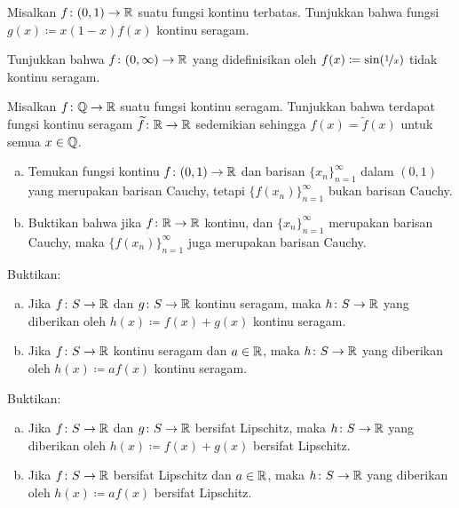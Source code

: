 \begin{exercise}
Misalkan $f \colon (0,1) \to {\mathbb{R}}$ suatu fungsi kontinu terbatas.  Tunjukkan bahwa
fungsi
$g(x) \coloneqq x(1-x)f(x)$ kontinu seragam.
\end{exercise}

\begin{exercise}
Tunjukkan bahwa $f \colon (0,\infty) \to {\mathbb{R}}$ yang didefinisikan oleh $f(x) \coloneqq \sin
(\nicefrac{1}{x})$ tidak kontinu seragam.
\end{exercise}

\begin{exercise}[Menantang]
Misalkan $f \colon {\mathbb{Q}} \to {\mathbb{R}}$ suatu fungsi kontinu seragam.  Tunjukkan bahwa
terdapat fungsi kontinu seragam $\widetilde{f} \colon {\mathbb{R}} \to {\mathbb{R}}$
sedemikian sehingga $f(x) = \widetilde{f}(x)$ untuk semua $x \in {\mathbb{Q}}$.
\end{exercise}

\begin{samepage}
\begin{exercise}
\leavevmode
\begin{enumerate}[a)]
\item
Temukan fungsi kontinu $f \colon (0,1) \to {\mathbb{R}}$ dan barisan
$\{ x_n \}_{n=1}^\infty$ dalam
$(0,1)$ yang merupakan barisan Cauchy, tetapi $\bigl\{ f(x_n) \bigr\}_{n=1}^\infty$ bukan barisan Cauchy.
\item
Buktikan bahwa jika $f \colon {\mathbb{R}} \to {\mathbb{R}}$ kontinu,
dan $\{ x_n \}_{n=1}^\infty$ merupakan
barisan Cauchy, maka $\bigl\{ f(x_n) \bigr\}_{n=1}^\infty$ juga merupakan barisan Cauchy.
\end{enumerate}
\end{exercise}
\end{samepage}

\begin{samepage}
\begin{exercise}
Buktikan:
\begin{enumerate}[a)]
\item
Jika $f \colon S \to {\mathbb{R}}$ dan $g \colon S \to {\mathbb{R}}$ kontinu seragam,
maka $h \colon S \to {\mathbb{R}}$ yang diberikan oleh $h(x) \coloneqq f(x) + g(x)$
kontinu seragam.
\item
Jika $f \colon S \to {\mathbb{R}}$ kontinu seragam dan $a \in {\mathbb{R}}$,
maka $h \colon S \to {\mathbb{R}}$ yang diberikan oleh $h(x) \coloneqq a f(x)$
kontinu seragam.
\end{enumerate}
\end{exercise}
\end{samepage}

\begin{exercise}
Buktikan:
\begin{enumerate}[a)]
\item
Jika $f \colon S \to {\mathbb{R}}$ dan $g \colon S \to {\mathbb{R}}$ bersifat Lipschitz,
maka $h \colon S \to {\mathbb{R}}$ yang diberikan oleh $h(x) \coloneqq f(x) + g(x)$
bersifat Lipschitz.
\item
Jika $f \colon S \to {\mathbb{R}}$ bersifat Lipschitz dan $a \in {\mathbb{R}}$,
maka $h \colon S \to {\mathbb{R}}$ yang diberikan oleh $h(x) \coloneqq a f(x)$
bersifat Lipschitz.
\end{enumerate}
\end{exercise}


